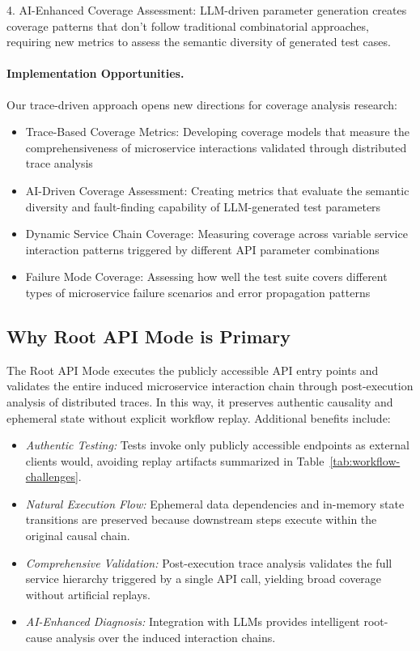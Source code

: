 \documentclass[conference]{IEEEtran}
\begin{document}
4. AI-Enhanced Coverage Assessment: LLM-driven parameter generation creates coverage patterns that don't follow traditional combinatorial approaches, requiring new metrics to assess the semantic diversity of generated test cases.

\paragraph{Implementation Opportunities.}
Our trace-driven approach opens new directions for coverage analysis research:
\begin{itemize}[leftmargin=*]
    \item {Trace-Based Coverage Metrics:} Developing coverage models that measure the comprehensiveness of microservice interactions validated through distributed trace analysis
    \item {AI-Driven Coverage Assessment:} Creating metrics that evaluate the semantic diversity and fault-finding capability of LLM-generated test parameters
    \item {Dynamic Service Chain Coverage:} Measuring coverage across variable service interaction patterns triggered by different API parameter combinations
    \item {Failure Mode Coverage:} Assessing how well the test suite covers different types of microservice failure scenarios and error propagation patterns
\end{itemize}


\subsection{Why \textbf{Root API Mode} is Primary}\label{ssec:root-benefits}

The Root API Mode executes the publicly accessible API entry points and validates the entire induced microservice interaction chain through post-execution analysis of distributed traces. In this way, it preserves authentic causality and ephemeral state without explicit workflow replay. Additional benefits include:

\begin{itemize}[leftmargin=*]
  \item \emph{Authentic Testing:} Tests invoke only publicly accessible endpoints as external clients would, avoiding replay artifacts summarized in Table~\ref{tab:workflow-challenges}.
  \item \emph{Natural Execution Flow:} Ephemeral data dependencies and in-memory state transitions are preserved because downstream steps execute within the original causal chain.
  \item \emph{Comprehensive Validation:} Post-execution trace analysis validates the full service hierarchy triggered by a single API call, yielding broad coverage without artificial replays.
  \item \emph{AI-Enhanced Diagnosis:} Integration with LLMs provides intelligent root-cause analysis over the induced interaction chains.
\end{itemize}
\end{document}
